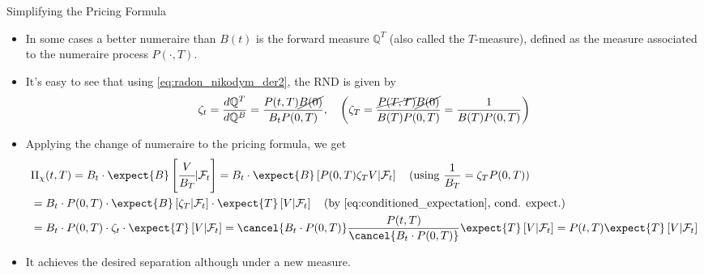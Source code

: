 \documentclass{beamer}
\begin{document}
	\begin{frame}{Simplifying the Pricing Formula}
		\begin{itemize}
			\item  In some cases a better numeraire than $B(t)$ is the \textcolor{maincolor}{forward measure} $\mathbb{Q}^T$ (also called the $T$-measure), defined as the measure associated to the numeraire process $P(\cdot,T)$.
			\item It's easy to see that using \cref{eq:radon_nikodym_der2}, the RND is given by
			\begin{equation}
				\zeta_t = \frac{d\mathbb{Q}^T}{d\mathbb{Q}^B} = \frac{P(t,T)\cancel{B(0)}}{B_t P(0,T)} ,\quad\left(\zeta_T=\frac{\cancel{P(T,T)}\cancel{B(0)}}{B(T)P(0,T)}=\frac{1}{B(T)P(0,T)}\right)
				\label{eq:radon_nikodym_t_forward}
			\end{equation}
			\item Applying the change of numeraire to the pricing formula, we get
			\begin{equation*}
				\begin{aligned}
					&\Pi_\chi(t,T) = B_t\cdot\expect{B}\left[\cfrac{V}{B_T}|\mathcal{F}_t\right]
					= B_t\cdot\expect{B}\left[P(0,T)\zeta_T V|\mathcal{F}_t\right]\quad\text{(using } \frac{1}{B_T} = \zeta_TP(0,T))\\
					& = B_t\cdot P(0,T)\cdot\expect{B}\left[\zeta_T|\mathcal{F}_t\right]\cdot\expect{T}\left[V|\mathcal{F}_t\right]\quad\text{(by \cref{eq:conditioned_expectation}, cond. expect.)}\\
					& = B_t\cdot P(0,T)\cdot\zeta_t\cdot\expect{T}\left[V|\mathcal{F}_t\right] =  \cancel{B_t\cdot P(0,T)}\frac{P(t,T)}{\cancel{B_t\cdot P(0,T)}}\expect{T}\left[V|\mathcal{F}_t\right] = P(t,T)\expect{T}\left[V|\mathcal{F}_t\right]
				\end{aligned}
			\end{equation*}
			\item It achieves the desired separation although under a new measure.
		\end{itemize}
	\end{frame}
\end{document}
